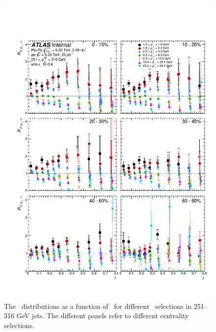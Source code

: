 \begin{figure}[h]
\includegraphics[width=1.0\textwidth]{figures/results/RDpT_dR_jet10}
\caption{The \RDptr\ distributions as a function of \rvar\ for different \pt\ selections in 251--316 GeV jets.
The different panels refer to different centrality selections.}
\label{fig:fullset_drtr_j10}
\end{figure}

